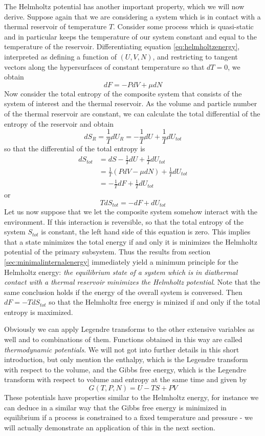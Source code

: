 \documentclass[a4paper, draft]{report}
\numberwithin{section}{chapter}
\numberwithin{equation}{chapter}
\theoremstyle{own}
\theoremstyle{remark}
\begin{document}
The Helmholtz potential has another important property, which we will now derive. Suppose again that we are considering a system which is in contact with a thermal reservoir of temperature $T$. Consider some process which is quasi-static and in particular keeps the temperature of our system constant and equal to the temperature of the reservoir. Differentiating equation \ref{eq:helmholtzenergy}, interpreted as defining a function of $(U,V,N)$, and restricting to tangent vectors along the hypersurfaces of constant temperature so that $dT = 0$, we obtain
$$
dF = - P dV + \mu dN
$$
Now consider the total entropy of the composite system that consists of the system of interest and the thermal reservoir. As the volume and particle number of the thermal reservoir are constant, we can calculate the 
total differential of the entropy of the reservoir and obtain
$$
d S_R = \frac{1}{T} dU_R = - \frac{1}{T} dU + \frac{1}{T} dU_{tot}
$$
so that the differential of the total entropy is
\begin{align*}
d S_{tot} &= dS - \frac{1}{T} dU + \frac{1}{T} dU_{tot} \\
& = \frac{1}{T} (P dV - \mu dN) + \frac{1}{T} dU_{tot} \\ 
&= - \frac{1}{T} dF + \frac{1}{T} dU_{tot}
\end{align*}
or
$$
T dS_{tot} = - dF + dU_{tot}
$$
Let us now suppose that we let the composite system somehow interact with the environment. If this interaction is reversible, so that the total entropy of the system $S_{tot}$ is constant, the left hand side of this equation is zero. This implies that a state minimizes the total energy if and only it is minimizes the Helmholtz potential of the primary subsystem. Thus the results from section \ref{sec:minimalinternalenergy} immediately yield a minimum principle for the Helmholtz energy: {\em the equilibrium state of a system which is in diathermal contact with a thermal reservoir minimizes the Helmholtz potential}. Note that the same conclusion holds if the energy of the overall system is conversed. Then $dF = - T dS_{tot}$ so that the Helmholtz free energy is minized if and only if the total entropy is maximized.


Obviously we can apply Legendre transforms to the other extensive variables as well and to combinations of them. Functions obtained in this way are called {\em thermodynamic potentials}. We will not got into further details in this short introduction, but only mention the enthalpy, which is the Legendre transform with respect to the volume, and the Gibbs free energy, which is the Legendre transform with respect to volume and entropy at the same time and given by
$$
G(T, P, N) = U - TS + PV
$$
These potentials have properties similar to the Helmholtz energy, for instance we can deduce in a similar way that the Gibbs free energy is minimized in equilibrium if a process is constrained to a fixed temperature and pressure - we will actually demonstrate an application of this in the next section.
\end{document}
